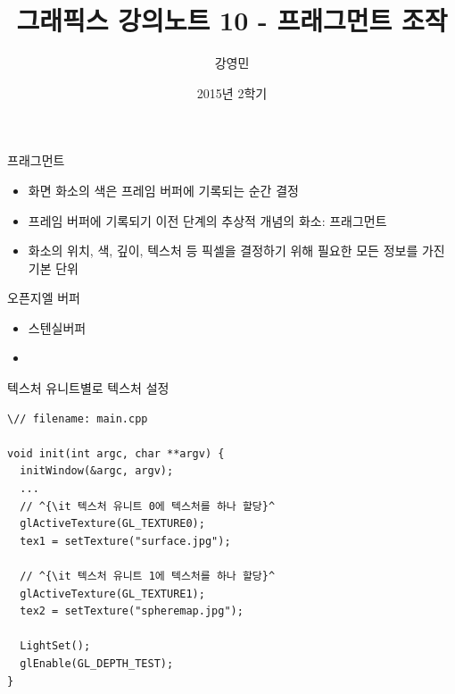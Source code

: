 \documentclass{beamer}
\title[3D 그래픽스 프로그래밍]{그래픽스 강의노트 10 - 프래그먼트 조작}
\author{강영민}
\institute{동명대학교}
\date{2015년 2학기}
\begin{document}
\begin{frame}
  \titlepage
\end{frame}






\begin{frame}[fragile]{프래그먼트}

\begin{itemize}
\item 화면 화소의 색은 프레임 버퍼에 기록되는 순간 결정
\item 프레임 버퍼에 기록되기 이전 단계의 추상적 개념의 화소: 프래그먼트
\item 화소의 위치, 색, 깊이, 텍스처 등 픽셀을 결정하기 위해 필요한 모든 정보를 가진 기본 단위
\end{itemize}


\end{frame}

\begin{frame}[fragile]{오픈지엘 버퍼}

\begin{itemize}
\item 스텐실버퍼
\item 
\end{itemize}

\end{frame}



\begin{frame}[fragile]{텍스처 유니트별로 텍스처 설정}

\lstset{language=C++, escapechar=^} 
\begin{lstlisting}
\// filename: main.cpp

void init(int argc, char **argv) {
  initWindow(&argc, argv);
  ...
  // ^{\it 텍스처 유니트 0에 텍스처를 하나 할당}^
  glActiveTexture(GL_TEXTURE0);
  tex1 = setTexture("surface.jpg");

  // ^{\it 텍스처 유니트 1에 텍스처를 하나 할당}^
  glActiveTexture(GL_TEXTURE1);
  tex2 = setTexture("spheremap.jpg");

  LightSet();
  glEnable(GL_DEPTH_TEST);
}
\end{lstlisting}

\end{frame}
\end{document}
